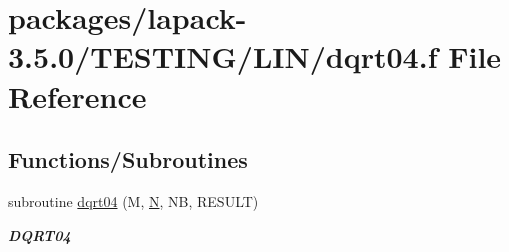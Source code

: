 \hypertarget{dqrt04_8f}{}\section{packages/lapack-\/3.5.0/\+T\+E\+S\+T\+I\+N\+G/\+L\+I\+N/dqrt04.f File Reference}
\label{dqrt04_8f}
\subsection*{Functions/\+Subroutines}
\begin{DoxyCompactItemize}
\item 
subroutine \hyperlink{group__double__lin_ga5ad584df09ee02db6fafb14c3650d3dc}{dqrt04} (M, \hyperlink{polmisc_8c_a0240ac851181b84ac374872dc5434ee4}{N}, N\+B, R\+E\+S\+U\+L\+T)
\begin{DoxyCompactList}\small\item\em {\bfseries D\+Q\+R\+T04} \end{DoxyCompactList}\end{DoxyCompactItemize}
